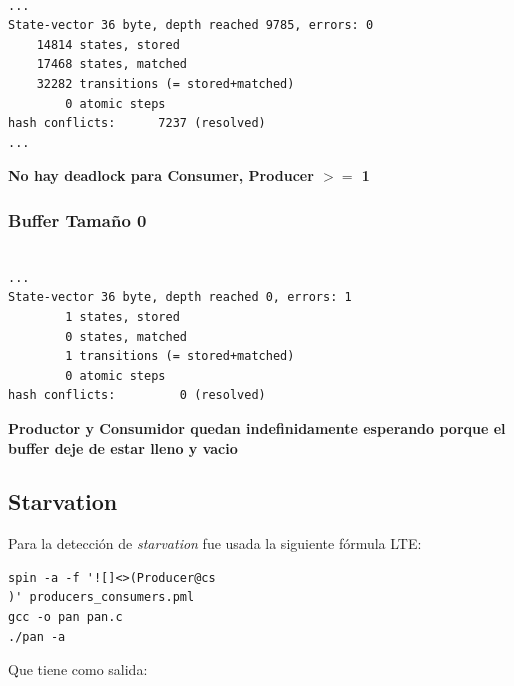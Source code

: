 \documentclass[a4paper,12pt]{article}
\begin{document}
\begin{lstlisting}[frame=single]

...
State-vector 36 byte, depth reached 9785, errors: 0
    14814 states, stored
    17468 states, matched
    32282 transitions (= stored+matched)
        0 atomic steps
hash conflicts:      7237 (resolved)
...
\end{lstlisting}
\textbf{No hay deadlock para Consumer, Producer $>=$ 1}

\subsubsection{Buffer Tamaño 0}
\begin{lstlisting}[frame=single]

...
State-vector 36 byte, depth reached 0, errors: 1
        1 states, stored
        0 states, matched
        1 transitions (= stored+matched)
        0 atomic steps
hash conflicts:         0 (resolved)
\end{lstlisting}

\textbf{Productor y Consumidor quedan indefinidamente esperando porque el buffer deje
de estar lleno y vacio}

\subsection{Starvation}

Para la detección de \textit{starvation} fue usada la siguiente fórmula LTE: 

\begin{lstlisting}[frame=single]
spin -a -f '![]<>(Producer@cs
)' producers_consumers.pml
gcc -o pan pan.c
./pan -a
\end{lstlisting}
 
Que tiene como salida:
\end{document}
